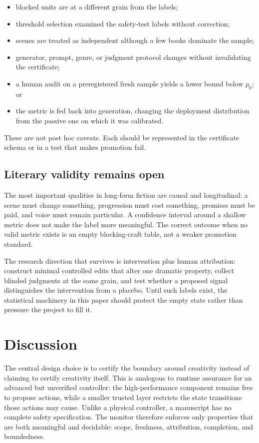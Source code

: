 \documentclass[11pt]{article}
\begin{document}
\begin{itemize}
  \item blocked units are at a different grain from the labels;
  \item threshold selection examined the safety-test labels without correction;
  \item scenes are treated as independent although a few books dominate the sample;
  \item generator, prompt, genre, or judgment protocol changes without invalidating the
  certificate;
  \item a human audit on a preregistered fresh sample yields a lower bound below $p_0$; or
  \item the metric is fed back into generation, changing the deployment distribution from
  the passive one on which it was calibrated.
\end{itemize}

These are not post hoc caveats. Each should be represented in the certificate schema or in a
test that makes promotion fail.

\subsection{Literary validity remains open}

The most important qualities in long-form fiction are causal and longitudinal: a scene must
change something, progression must cost something, promises must be paid, and voice must
remain particular. A confidence interval around a shallow metric does not make the label more
meaningful. The correct outcome when no valid metric exists is an empty blocking-craft table,
not a weaker promotion standard.

The research direction that survives is intervention plus human attribution: construct
minimal controlled edits that alter one dramatic property, collect blinded judgments at the
same grain, and test whether a proposed signal distinguishes the intervention from a
placebo. Until such labels exist, the statistical machinery in this paper should protect the
empty state rather than pressure the project to fill it.

\section{Discussion}

The central design choice is to certify the boundary around creativity instead of claiming
to certify creativity itself. This is analogous to runtime assurance for an advanced but
unverified controller: the high-performance component remains free to propose actions, while
a smaller trusted layer restricts the state transitions those actions may cause. Unlike a
physical controller, a manuscript has no complete safety specification. The monitor therefore
enforces only properties that are both meaningful and decidable: scope, freshness,
attribution, completion, and boundedness.
\end{document}
